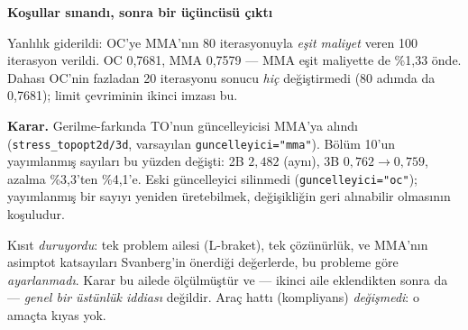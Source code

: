 \documentclass[11pt,a4paper]{article}
\newcommand{\kkkenar}{lacivert}
\newcommand{\kkzemin}{kod}
\newenvironment{renkkutu}[3]{%
  \renewcommand{\kkkenar}{#1}\renewcommand{\kkzemin}{#2}%
  \par\medskip\noindent
  \begin{lrbox}{\kutugovde}%
  \begin{minipage}{\dimexpr\linewidth-2\fboxsep-2\fboxrule\relax}\footnotesize
  \textcolor{#1}{\textbf{#3}}\par\vspace{3pt}%
}{%
  \end{minipage}%
  \end{lrbox}%
  \noindent\fcolorbox{\kkkenar}{\kkzemin}{\usebox{\kutugovde}}%
  \par\medskip
}
\newenvironment{dikkat}[1]{\begin{renkkutu}{orta}{ortabg}{#1}}{\end{renkkutu}}
\begin{document}
\begin{dikkat}{Koşullar sınandı, sonra bir üçüncüsü çıktı}
\noindent Yanlılık giderildi: OC'ye MMA'nın 80 iterasyonuyla \emph{eşit
maliyet} veren 100 iterasyon verildi. OC 0{,}7681, MMA
0{,}7579 --- MMA eşit maliyette de \%1{,}33 önde. Dahası OC'nin
fazladan 20 iterasyonu sonucu \emph{hiç} değiştirmedi (80 adımda da
0{,}7681); limit çevriminin ikinci imzası bu.

\textbf{Karar.} Gerilme-farkında TO'nun güncelleyicisi MMA'ya alındı
(\texttt{stress\_topopt2d/3d}, varsayılan \texttt{guncelleyici="mma"}).
Bölüm 10'un yayımlanmış sayıları bu yüzden değişti: 2B $2{,}482$ (aynı),
3B $0{,}762 \to 0{,}759$, azalma \%3{,}3'ten \%4{,}1'e. Eski güncelleyici
silinmedi (\texttt{guncelleyici="oc"}); yayımlanmış bir sayıyı yeniden
üretebilmek, değişikliğin geri alınabilir olmasının koşuludur.

Kısıt \emph{duruyordu}: tek problem ailesi (L-braket), tek çözünürlük, ve MMA'nın
asimptot katsayıları Svanberg'in önerdiği değerlerde, bu probleme göre
\emph{ayarlanmadı}. Karar bu ailede ölçülmüştür ve --- ikinci aile
eklendikten sonra da --- \emph{genel bir üstünlük iddiası} değildir. Araç
hattı (kompliyans) \emph{değişmedi}: o amaçta kıyas yok.
\end{dikkat}
\end{document}
